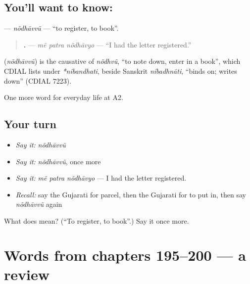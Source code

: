 \subsection*{You'll want to know: }
\textbf{} — \emph{nõdhāvvũ} — \textquotedblleft{}to register, to book\textquotedblright{}.

\begin{quote}
\textbf{  .} — \emph{mẽ patra nõdhāvyo} — \textquotedblleft{}I had the letter registered.\textquotedblright{}
\end{quote}

\begin{cousinweb}
\textbf{} (\emph{nõdhāvvũ}) is the causative of \emph{nõdhvũ}, \textquotedblleft{}to note down, enter in a book\textquotedblright{}, which CDIAL lists under \emph{*nibandhati}, beside Sanskrit \emph{níbadhnāti}, \textquotedblleft{}binds on; writes down\textquotedblright{} (CDIAL 7223).
\end{cousinweb}

\begin{grammarlens}[title={What you've built}]
One more word for everyday life at A2.
\end{grammarlens}

\subsection*{Your turn}
\begin{itemize}
\raggedright
  \item \emph{Say it:} \emph{nõdhāvvũ}
  \item \emph{Say it:} \emph{nõdhāvvũ}, once more
  \item \emph{Say it:} \emph{mẽ patra nõdhāvyo} — I had the letter registered.
  \item \emph{Recall:} say the Gujarati for parcel, then the Gujarati for to put in, then say \emph{nõdhāvvũ} again
\end{itemize}

\begin{tcolorbox}[breakable,colback=teal!4,colframe=teal!35!black,title={Before you move on}]
What does  mean? (\textquotedblleft{}To register, to book\textquotedblright{}.) Say it once more.
\end{tcolorbox}
\section[(dialogue)]{Words from chapters 195–200 — a review}

